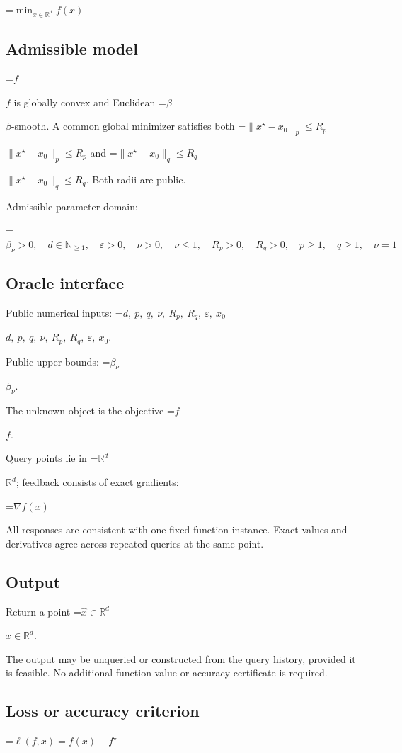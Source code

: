 \documentclass[10pt,a4paper]{article}
\newcommand{\AtlasMath}[1]{\par\begingroup\centering\setbox0=\hbox{$\displaystyle #1$}\ifdim\wd0>1.4\linewidth\typeout{ATLAS WIDE FORMULA: \the\wd0}\fi\ifdim\wd0>\linewidth\resizebox{\linewidth}{!}{\box0}\else\box0\fi\par\endgroup}
\newcommand{\AtlasInlineMath}[1]{\begingroup\setbox0=\hbox{$#1$}\ifdim\wd0>.4\linewidth\endgroup\AtlasMath{#1}\else\endgroup$#1$\fi}
\begin{document}
\AtlasMath{\min_{x\in \mathbb{R}^d}f(x)}


\subsection{Admissible model}
\AtlasInlineMath{f} is globally convex and Euclidean \AtlasInlineMath{\beta}-smooth. A common global minimizer satisfies both \AtlasInlineMath{\|x^\star-x_0\|_p\le R_p} and \AtlasInlineMath{\|x^\star-x_0\|_q\le R_q}. Both radii are public.

Admissible parameter domain:


\AtlasMath{\beta_\nu>0,\quad d\in\mathbb{N}_{\ge1},\quad \varepsilon>0,\quad \nu>0,\quad \nu\le1,\quad R_p>0,\quad R_q>0,\quad p\ge1,\quad q\ge1,\quad \nu=1}


\subsection{Oracle interface}
Public numerical inputs: \AtlasInlineMath{d,\ p,\ q,\ \nu,\ R_p,\ R_q,\ \varepsilon,\ x_0}.

Public upper bounds: \AtlasInlineMath{\beta_\nu}.

The unknown object is the objective \AtlasInlineMath{f}.

Query points lie in \AtlasInlineMath{\mathbb{R}^d}; feedback consists of exact gradients:


\AtlasMath{\nabla f(x)}


All responses are consistent with one fixed function instance. Exact values and derivatives agree across repeated queries at the same point.

\subsection{Output}
Return a point \AtlasInlineMath{\widehat x\in\mathbb R^d}.

The output may be unqueried or constructed from the query history, provided it is feasible. No additional function value or accuracy certificate is required.

\subsection{Loss or accuracy criterion}

\AtlasMath{\ell(f,x)=f(x)-f^\star}
\end{document}
